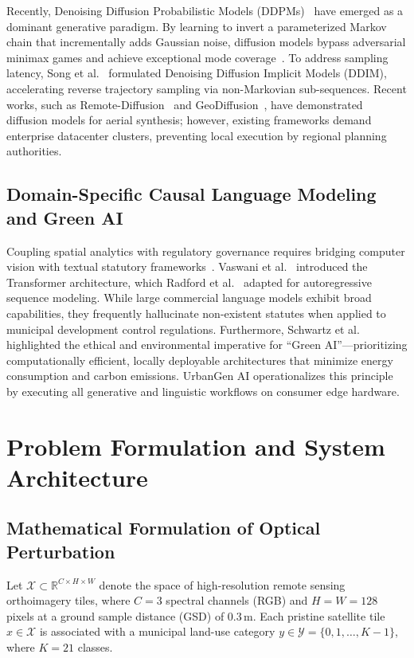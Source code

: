 \documentclass[journal]{IEEEtran}
\begin{document}
Recently, Denoising Diffusion Probabilistic Models (DDPMs)~\cite{sohl2015deep,ho2020denoising} have emerged as a dominant generative paradigm. By learning to invert a parameterized Markov chain that incrementally adds Gaussian noise, diffusion models bypass adversarial minimax games and achieve exceptional mode coverage~\cite{dhariwal2021diffusion}. To address sampling latency, Song et al.~\cite{song2020denoising} formulated Denoising Diffusion Implicit Models (DDIM), accelerating reverse trajectory sampling via non-Markovian sub-sequences. Recent works, such as Remote-Diffusion~\cite{chen2023remote} and GeoDiffusion~\cite{tan2024geodiffusion}, have demonstrated diffusion models for aerial synthesis; however, existing frameworks demand enterprise datacenter clusters, preventing local execution by regional planning authorities.

\subsection{Domain-Specific Causal Language Modeling and Green AI}
Coupling spatial analytics with regulatory governance requires bridging computer vision with textual statutory frameworks~\cite{batty2013new,benediktsson2015remote}. Vaswani et al.~\cite{vaswani2017attention} introduced the Transformer architecture, which Radford et al.~\cite{radford2019language} adapted for autoregressive sequence modeling. While large commercial language models exhibit broad capabilities, they frequently hallucinate non-existent statutes when applied to municipal development control regulations. Furthermore, Schwartz et al.~\cite{schwartz2020green} highlighted the ethical and environmental imperative for ``Green AI''---prioritizing computationally efficient, locally deployable architectures that minimize energy consumption and carbon emissions. UrbanGen AI operationalizes this principle by executing all generative and linguistic workflows on consumer edge hardware.

\section{Problem Formulation and System Architecture}
\subsection{Mathematical Formulation of Optical Perturbation}
Let $\mathcal{X} \subset \mathbb{R}^{C \times H \times W}$ denote the space of high-resolution remote sensing orthoimagery tiles, where $C=3$ spectral channels (RGB) and $H=W=128$ pixels at a ground sample distance (GSD) of 0.3\,m. Each pristine satellite tile $x \in \mathcal{X}$ is associated with a municipal land-use category $y \in \mathcal{Y} = \{0, 1, \dots, K-1\}$, where $K=21$ classes.
\end{document}
